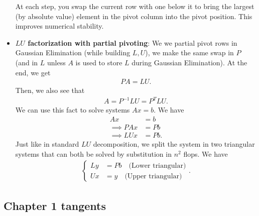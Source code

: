 \documentclass{report}
\begin{document}
\begin{itemize}
        At each step, you swap the current row with one below it to bring the largest (by absolute value) element in the pivot column into the pivot position. This improves numerical stability.
    \item \textbf{$LU$ factorization with partial pivoting}: We we partial pivot rows in Gaussian Elimination (while building $L,U$), we make the same swap in $P$ (and in $L$ unless $A$ is used to store $L$ during Gaussian Elimination).
        \bigbreak \noindent 
        At the end, we get
        \begin{align*}
            PA = LU
        .\end{align*}
        Then, we also see that
        \begin{align*}
            A = P^{-1}LU = P^{T}LU
        .\end{align*}
        We can use this fact to solve systems $Ax = b$. We have
        \begin{align*}
            Ax &= b \\
            \implies PAx &= Pb \\
            \implies LUx &= Pb
        .\end{align*}
        Just like in standard $LU$ decomposition, we split the system in two triangular systems that can both be solved by substitution in $n^{2}$ flops. We have
        \begin{align*}
            \begin{cases}
                Ly &= Pb  \quad \text{(Lower triangular)}\\
                Ux &= y \quad \text{(Upper triangular)}
            \end{cases}
        .\end{align*}


\end{itemize}

    \pagebreak 
    \subsection{Chapter 1 tangents}
    \bigbreak \noindent 
\end{document}
